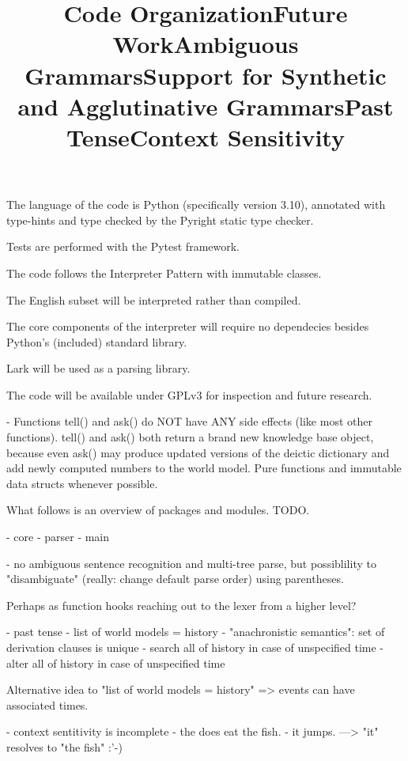 \title{Code Organization}

The language of the code is Python (specifically version 3.10), annotated with type-hints and type checked by the Pyright static type checker.

Tests are performed with the Pytest framework.

The code follows the Interpreter Pattern with immutable classes.

The English subset will be interpreted rather than compiled.

The core components of the interpreter will require no dependecies besides Python's (included) standard library.

Lark will be used as a parsing library.

The code will be available under GPLv3 for inspection and future research.

- Functions tell() and ask() do NOT have ANY side effects (like most other
  functions). tell() and ask() both return a brand new knowledge base object,
  because even ask() may produce updated versions of the deictic dictionary and
  add newly computed numbers to the world model. Pure functions and immutable
  data structs whenever possible.

What follows is an overview of packages and modules. TODO.

- core
- parser
- main




\title{Future Work}

\title{Ambiguous Grammars}

- no ambiguous sentence recognition and multi-tree parse, but possiblility to
  "disambiguate" (really: change default parse order) using parentheses.


\title{Support for Synthetic and Agglutinative Grammars}

Perhaps as function hooks reaching out to the lexer from a higher level?

\title{Past Tense}

- past tense
  - list of world models = history
  - "anachronistic semantics": set of derivation clauses is unique
  - search all of history in case of unspecified time
  - alter all of history in case of unspecified time

Alternative idea to "list of world models = history" => events can have associated times.

\title{Context Sensitivity}

- context sentitivity is incomplete
  - the does eat the fish.
  - it jumps. ---> "it" resolves to "the fish" :'-)

